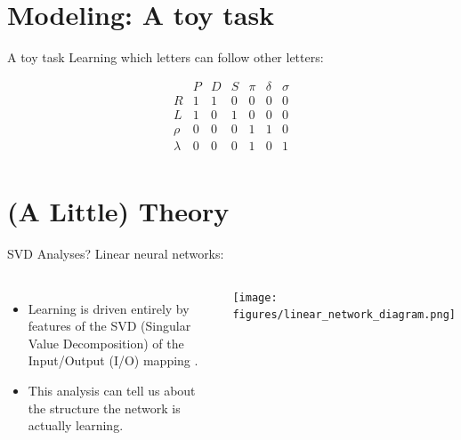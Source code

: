 \documentclass{beamer}
\begin{document}
\section{Modeling: A toy task}
\begin{frame}{A toy task}
Learning which letters can follow other letters:\vspace{-2em}
\begin{center}
\[
\begin{array}{c|cccccc} 
& P & D & S & \pi & \delta & \sigma \\
\hline
R & 1 & 1 & 0 & 0 & 0 & 0 \\
L & 1 & 0 & 1 & 0 & 0 & 0 \\
\rho & 0 & 0 & 0 & 1 & 1 & 0\\
\lambda & 0 & 0 & 0 & 1 & 0 & 1\\
\end{array} 
\]
\end{center}
\end{frame}

\section{(A Little) Theory}
\begin{frame}{SVD Analyses?}
Linear neural networks:
\begin{columns}
\begin{itemize}
    \item<2-> Learning is driven entirely by features of the SVD (Singular Value Decomposition) of the Input/Output (I/O) mapping \cite{Saxe2013}.
    \item<3-> This analysis can tell us about the structure the network is actually learning. 
\end{itemize}
    \texttt{[image: figures/linear\_network\_diagram.png]}
\end{columns}
\end{frame}
\end{document}
